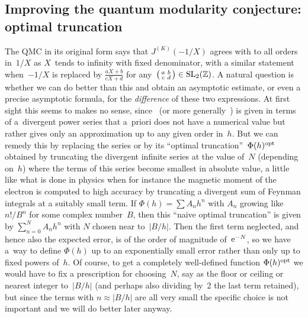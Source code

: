 \documentclass[pdftex]{sigma}
\numberwithin{equation}{section}
\def\SL{\mathrm{SL}}
\def\Phih{\widehat\Phi}
\def\Z{\mathbb Z}
\def\sma#1#2#3#4{\bigl(\smallmatrix#1&#2\\#3&#4\endsmallmatrix\bigr)} %
\def\J{\mathbf J} \def\J{J} %
\begin{document}
\subsection{Improving the quantum modularity conjecture:
 optimal truncation}
\label{sub.4.1}

The QMC in its original form says that $\J^{(K)}(-1/X)$ agrees with
\smash{$X^{3/2} \J^{(K)}(X) \Phih_0^{(K)}(2\pi {\rm i}/X)$} to all orders in~$1/X$ as
$X$~tends to infinity with fixed denominator, with a similar statement when~$-1/X$ is replaced by $\frac{aX+b}{cX+d}$ for any~$\sma abcd\in\SL_2(\Z)$.
A natural question is whether we can do better than this and obtain an
asymptotic estimate, or even a precise asymptotic formula, for the \emph{difference}
of these two expressions. At first sight this seems to
makes no sense, since~\smash{$\Phih_0^{(K)}(h)$} \big(or more generally~\smash{$\Phih_{a/c}^{(K)}(h)$}\big)
is given in terms of a~divergent power series that a~priori
does not have a numerical value but rather gives only an approximation
up to any given order in~$h$. But we can remedy this by replacing the series
 or  by its ``optimal truncation''~$\Phi(h)^{{\rm opt}}$ obtained by truncating the divergent infinite series at
the value of~$N$ (depending on~$h$) where the terms of this series become smallest
in absolute value, a little like what is done in physics when for instance
the magnetic moment of the electron is computed to high accuracy by truncating a
divergent sum of Feynman integrals at a suitably small term. If $\Phi(h)=\sum A_nh^n$
with $A_n$ growing like $n!/B^n$ for some complex number~$B$, then this
``naive optimal truncation'' is given by $\sum_{n=0}^NA_nh^n$ with $N$ chosen
near to~$|B/h|$. Then the first term neglected, and hence also the expected
error, is of the order of magnitude of~${\rm e}^{-N}$, so we have a~way to define
$\Phi(h)$ up to an exponentially small error rather than only up to fixed
powers of~$h$. Of course, to get a completely well-defined function
$\Phi(h)^{{\rm opt}}$ we would have to fix a prescription for choosing~$N$, say
as the floor or ceiling or nearest integer to~$|B/h|$ (and perhaps also
dividing by~2 the last term retained), but since the terms with $n\approx|B/h|$ are all
very small the specific choice is not important and we will do better later anyway.
\end{document}
